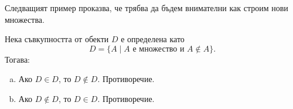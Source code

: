 Следващият пример проказва, че трябва да бъдем внимателни как строим нови множества.
\begin{example}
  Нека съвкупността от обекти $D$ е определена като
  \[D = \{A\mid A\mbox{ е множество и } A\not\in A\}.\]
  Тогава:
  \begin{enumerate}[a)]
  \item
    Ако $D \in D$, то $D \not\in D$. Противоречие.
  \item
    Ако $D \not\in D$, то $D \in D$. Противоречие.
  \end{enumerate}
\end{example}



  




